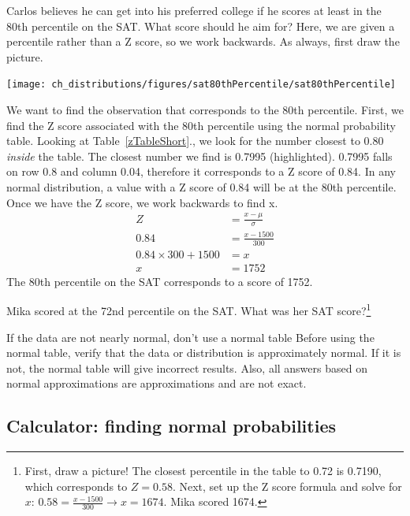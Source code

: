 \begin{example}{Carlos believes he can get into his preferred college if he scores at least in the 80th percentile on the SAT. What score should he aim for?}
Here, we are given a percentile rather than a Z score, so we work backwards. As always, first draw the picture.
\begin{center}
\texttt{[image: ch\_distributions/figures/sat80thPercentile/sat80thPercentile]}
\end{center}
We want to find the observation that corresponds to the 80th percentile. First, we find the Z score associated with the 80th percentile using the normal probability table. Looking at Table~\ref{zTableShort}., we look for the number closest to 0.80 \emph{inside} the table. The closest number we find is 0.7995 (highlighted). 0.7995 falls on row 0.8 and column 0.04, therefore it corresponds to a Z score of 0.84. In any normal distribution, a value with a Z score of 0.84 will be at the 80th percentile. Once we have the Z score, we work backwards to find x.
\begin{align*}
Z &= \frac{x-\mu}{\sigma} \\
0.84 &= \frac{x-1500}{300} \\
0.84 \times 300+1500 &= x \\
x& = 1752
\end{align*}
The 80th percentile on the SAT corresponds to a score of 1752.
\end{example}

\begin{exercise}Mika scored at the 72nd percentile on the SAT. What was her SAT score?\footnote{First, draw a picture! The closest percentile in the table to 0.72 is 0.7190, which corresponds to $Z = 0.58$. Next, set up the Z score formula and solve for $x$: $0.58 = \frac{x-1500}{300} \rightarrow x = 1674$. Mika scored 1674.}
\end{exercise}

\begin{caution}{If the data are not nearly normal, don't use a normal table}
{Before using the normal table, verify that the data or distribution is approximately normal. If it is not, the normal table will give incorrect results. Also, all answers based on normal approximations are approximations and are not exact.}
\end{caution}



\subsection{Calculator: finding normal probabilities}
\label{TInormal}

